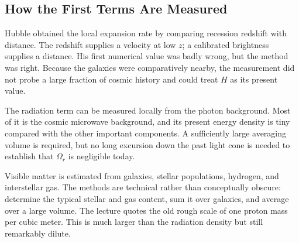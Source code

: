 \subsection{How the First Terms Are Measured}

Hubble obtained the local expansion rate by comparing recession redshift with distance. The redshift supplies a velocity at low \(z\); a calibrated brightness supplies a distance. His first numerical value was badly wrong, but the method was right. Because the galaxies were comparatively nearby, the measurement did not probe a large fraction of cosmic history and could treat \(H\) as its present value.

\begin{classroomqa}
\end{classroomqa}

\begin{classroomqa}
\end{classroomqa}

The radiation term can be measured locally from the photon background. Most of it is the cosmic microwave background, and its present energy density is tiny compared with the other important components. A sufficiently large averaging volume is required, but no long excursion down the past light cone is needed to establish that \(\Omega_r\) is negligible today.

Visible matter is estimated from galaxies, stellar populations, hydrogen, and interstellar gas. The methods are technical rather than conceptually obscure: determine the typical stellar and gas content, sum it over galaxies, and average over a large volume. The lecture quotes the old rough scale of one proton mass per cubic meter. This is much larger than the radiation density but still remarkably dilute.

